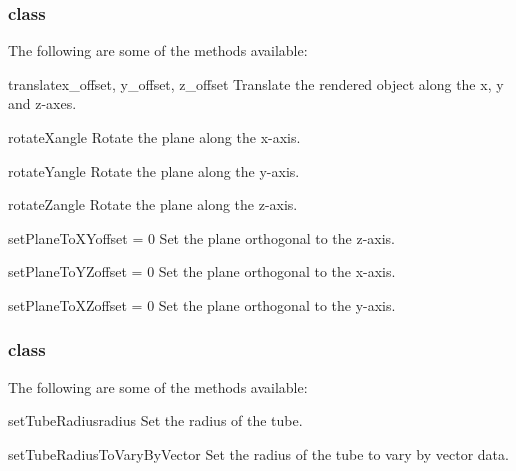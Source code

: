 \subsubsection{\Transform class}

The following are some of the methods available:

\begin{methoddesc}[Transform]{translate}{x_offset, y_offset, z_offset}
Translate the rendered object along the x, y and z-axes.
\end{methoddesc}

\begin{methoddesc}[Transform]{rotateX}{angle}
Rotate the plane along the x-axis.
\end{methoddesc}

\begin{methoddesc}[Transform]{rotateY}{angle}
Rotate the plane along the y-axis.
\end{methoddesc}

\begin{methoddesc}[Transform]{rotateZ}{angle}
Rotate the plane along the z-axis.
\end{methoddesc}

\begin{methoddesc}[Transform]{setPlaneToXY}{offset = 0}
Set the plane orthogonal to the z-axis.
\end{methoddesc}

\begin{methoddesc}[Transform]{setPlaneToYZ}{offset = 0}
Set the plane orthogonal to the x-axis.
\end{methoddesc}

\begin{methoddesc}[Transform]{setPlaneToXZ}{offset = 0}
Set the plane orthogonal to the y-axis.
\end{methoddesc}

\subsubsection{\Tube class}

The following are some of the methods available:

\begin{methoddesc}[Tube]{setTubeRadius}{radius}
Set the radius of the tube.
\end{methoddesc}

\begin{methoddesc}[Tube]{setTubeRadiusToVaryByVector}{}
Set the radius of the tube to vary by vector data.
\end{methoddesc}

